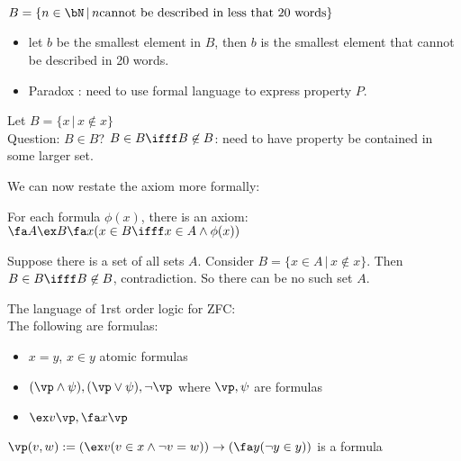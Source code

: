 \begin{example}
    $B = \{ n \in \bN \, | \, n \text{cannot be described in less that 20 words} \}$
    \begin{itemize}
        \item let $b$ be the smallest element in $B$, then $b$ is the smallest element that cannot be described in 20 words. 
        \item Paradox : need to use formal language to express property $P$. 
    \end{itemize}
\end{example}

\begin{example}
    Let $B = \{x \, | \, x \not\in x\}$ \\
    Question: $B \in B$? $B \in B \ifff B \not\in B$: need to have property be contained in some larger set.
\end{example}

\noindent 
We can now restate the axiom more formally: 

\begin{axiom}
    For each formula $\phi(x)$, there is an axiom: \\ 
    $\fa A \ex B \fa x (x \in B \ifff x \in A \wedge \phi(x))$ 
\end{axiom}

\begin{example}
    Suppose there is a set of all sets $A$. Consider $B = \{x \in A \, | \, x \not \in x \}$. Then $B \in B \ifff B \not\in B$, contradiction. So there can be no such set $A$.
\end{example}

\noindent
The language of 1rst order logic for ZFC: \\
The following are formulas: 
\begin{itemize}
    \item $x = y$, $x \in y$ \quad atomic formulas 
    \item $(\vp \wedge \psi), (\vp \vee \psi), \neg \vp$ \quad where $\vp, \psi$ are formulas 
    \item $\ex v \vp, \fa x \vp$
\end{itemize}

\begin{example}
    $\vp(v,w):= (\ex v (v \in x \wedge \neg v=w)) \to (\fa y (\neg y \in y))$ is a formula 
\end{example}
